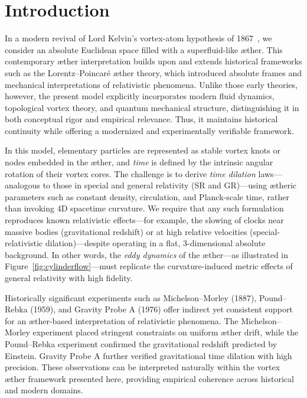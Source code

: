 \documentclass[a4paper,12pt]{article}
\begin{document}
\section{Introduction}
In a modern revival of Lord Kelvin's vortex-atom hypothesis of 1867~\cite{Kelvin1867-vortex}, we consider an absolute Euclidean space filled with a superfluid-like æther. This contemporary æther interpretation builds upon and extends historical frameworks such as the Lorentz–Poincaré æther theory, which introduced absolute frames and mechanical interpretations of relativistic phenomena. Unlike those early theories, however, the present model explicitly incorporates modern fluid dynamics, topological vortex theory, and quantum mechanical structure, distinguishing it in both conceptual rigor and empirical relevance. Thus, it maintains historical continuity while offering a modernized and experimentally verifiable framework.

In this model, elementary particles are represented as stable vortex knots or nodes embedded in the æther, and \emph{time} is defined by the intrinsic angular rotation of their vortex cores. The challenge is to derive \emph{time dilation} laws—analogous to those in special and general relativity (SR and GR)—using ætheric parameters such as constant density, circulation, and Planck-scale time, rather than invoking 4D spacetime curvature. We require that any such formulation reproduces known relativistic effects—for example, the slowing of clocks near massive bodies (gravitational redshift) or at high relative velocities (special-relativistic dilation)—despite operating in a flat, 3-dimensional absolute background. In other words, the \emph{eddy dynamics} of the æther—as illustrated in Figure~\ref{fig:cylinderflow}—must replicate the curvature-induced metric effects of general relativity with high fidelity.

Historically significant experiments such as Michelson–Morley (1887), Pound–Rebka (1959), and Gravity Probe A (1976) offer indirect yet consistent support for an æther-based interpretation of relativistic phenomena. The Michelson–Morley experiment placed stringent constraints on uniform æther drift, while the Pound–Rebka experiment confirmed the gravitational redshift predicted by Einstein. Gravity Probe A further verified gravitational time dilation with high precision. These observations can be interpreted naturally within the vortex æther framework presented here, providing empirical coherence across historical and modern domains.
\end{document}
